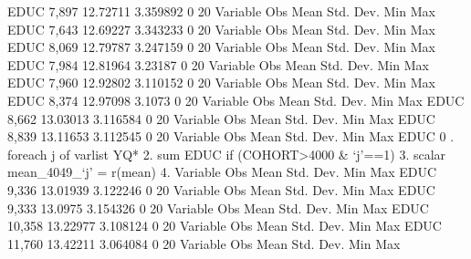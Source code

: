         EDUC {\VBAR}      7,897    12.72711    3.359892          0         20
{\smallskip}
    Variable {\VBAR}        Obs        Mean    Std. Dev.       Min        Max
        EDUC {\VBAR}      7,643    12.69227    3.343233          0         20
{\smallskip}
    Variable {\VBAR}        Obs        Mean    Std. Dev.       Min        Max
        EDUC {\VBAR}      8,069    12.79787    3.247159          0         20
{\smallskip}
    Variable {\VBAR}        Obs        Mean    Std. Dev.       Min        Max
        EDUC {\VBAR}      7,984    12.81964     3.23187          0         20
{\smallskip}
    Variable {\VBAR}        Obs        Mean    Std. Dev.       Min        Max
        EDUC {\VBAR}      7,960    12.92802    3.110152          0         20
{\smallskip}
    Variable {\VBAR}        Obs        Mean    Std. Dev.       Min        Max
        EDUC {\VBAR}      8,374    12.97098      3.1073          0         20
{\smallskip}
    Variable {\VBAR}        Obs        Mean    Std. Dev.       Min        Max
        EDUC {\VBAR}      8,662    13.03013    3.116584          0         20
{\smallskip}
    Variable {\VBAR}        Obs        Mean    Std. Dev.       Min        Max
        EDUC {\VBAR}      8,839    13.11653    3.112545          0         20
{\smallskip}
    Variable {\VBAR}        Obs        Mean    Std. Dev.       Min        Max
        EDUC {\VBAR}          0
{\smallskip}
. foreach j of varlist YQ* {\lbr}
  2.                 sum EDUC if (COHORT>4000 \& `j'==1)
  3.                 scalar mean_4049_`j' = r(mean)
  4. {\rbr}
{\smallskip}
    Variable {\VBAR}        Obs        Mean    Std. Dev.       Min        Max
        EDUC {\VBAR}      9,336    13.01939    3.122246          0         20
{\smallskip}
    Variable {\VBAR}        Obs        Mean    Std. Dev.       Min        Max
        EDUC {\VBAR}      9,333     13.0975    3.154326          0         20
{\smallskip}
    Variable {\VBAR}        Obs        Mean    Std. Dev.       Min        Max
        EDUC {\VBAR}     10,358    13.22977    3.108124          0         20
{\smallskip}
    Variable {\VBAR}        Obs        Mean    Std. Dev.       Min        Max
        EDUC {\VBAR}     11,760    13.42211    3.064084          0         20
{\smallskip}
    Variable {\VBAR}        Obs        Mean    Std. Dev.       Min        Max
